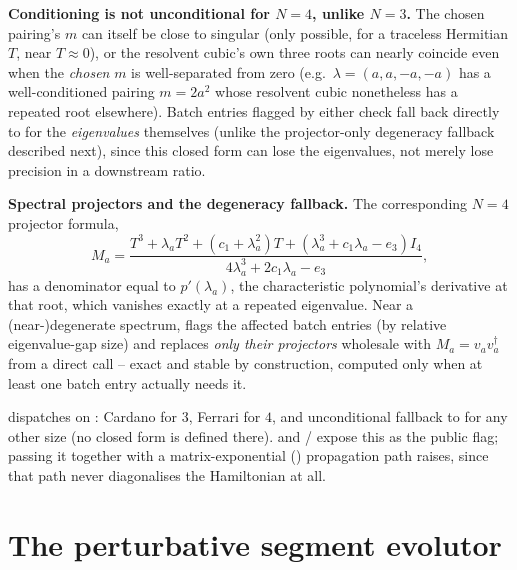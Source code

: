 \begin{notebox}
\textbf{Conditioning is not unconditional for $N=4$, unlike $N=3$.} The
chosen pairing's $m$ can itself be close to singular (only possible, for a
traceless Hermitian $T$, near $T\approx0$), or the resolvent cubic's own
three roots can nearly coincide even when the \emph{chosen} $m$ is
well-separated from zero (e.g.\ $\lambda=(a,a,-a,-a)$ has a
well-conditioned pairing $m=2a^2$ whose resolvent cubic nonetheless has a
repeated root elsewhere). Batch entries flagged by either check fall back
directly to  for the \emph{eigenvalues}
themselves (unlike the projector-only degeneracy fallback described next),
since this closed form can lose the eigenvalues, not merely lose precision
in a downstream ratio.

\textbf{Spectral projectors and the degeneracy fallback.} The corresponding
$N=4$ projector formula,
\begin{equation}
  M_a = \frac{T^3+\lambda_aT^2+(c_1+\lambda_a^2)T+(\lambda_a^3+c_1\lambda_a-e_3)I_4}{4\lambda_a^3+2c_1\lambda_a-e_3},
\end{equation}
has a denominator equal to $p'(\lambda_a)$, the characteristic polynomial's
derivative at that root, which vanishes exactly at a repeated eigenvalue.
Near a (near-)degenerate spectrum, 
flags the affected batch entries (by relative eigenvalue-gap size) and
replaces \emph{only their projectors} wholesale with
$M_a=v_av_a^\dagger$ from a direct  call --
exact and stable by construction, computed only when at least one batch
entry actually needs it.
\end{notebox}

\begin{implbox}
 dispatches on : Cardano for
$3$, Ferrari for $4$, and unconditional fallback to
 for any other size (no closed form is
defined there).  and
/ expose this as the
public  flag; passing it together with a
matrix-exponential () propagation path raises,
since that path never diagonalises the Hamiltonian at all.
\end{implbox}

\section{The perturbative segment evolutor}
\label{sec:impl-perturbative-sterile}

